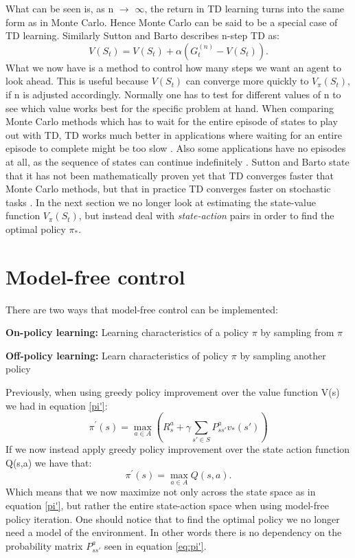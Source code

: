 What can be seen is, as n $\to$ $\infty$, the return in TD learning turns into the same form as in Monte Carlo. Hence Monte Carlo can be said to be a special case of TD learning.
Similarly Sutton and Barto describes n-step TD as:
\begin{equation}
	V(S_t) = V(S_t) + \alpha(G_t^{(n)} - V(S_t)).
	\label{eq:n_step_TD}
\end{equation} 
What we now have is a method to control how many steps we want an agent to look ahead. This is useful because $V(S_t)$ can converge more quickly to $V_\pi(S_t)$, if n is adjusted accordingly. Normally one has to test for different values of n to see which value works best for the specific problem at hand. When comparing Monte Carlo methods which has to wait for the entire episode of states to play out with TD, TD works much better in applications where waiting for an entire episode to complete might be too slow \cite{sutton_barto}. Also some applications have no episodes at all, as the sequence of states can continue indefinitely \cite{sutton_barto}. Sutton and Barto state that it has not been mathematically proven yet that TD converges faster that Monte Carlo methods, but that in practice TD converges faster on stochastic tasks \cite{sutton_barto}. In the next section we no longer look at estimating the state-value function $V_\pi(S_t)$, but instead deal with \textit{state-action} pairs in order to find the optimal policy $\pi_{*}$.

\section{Model-free control}
There are two ways that model-free control can be implemented:

\textbf{On-policy learning:}
Learning characteristics of a policy $\pi$ by sampling from $\pi$

\textbf{Off-policy learning:}
Learn characteristics of policy $\pi$ by sampling another policy

\noindent Previously, when using greedy policy improvement over the value function V(s) we had in equation \ref{pi'}:
\[\pi^{'}(s) = \max\limits_{a \in A}(R^{a}_s+\gamma\sum_{s'\in S}P^{a}_{ss'}v_*(s'))\]
If we now instead apply greedy policy improvement over the state action function Q(s,a) we have that:
\begin{equation}
	\pi^{'}(s) = \max\limits_{a \in A}Q(s,a).
	\label{eq:pi'}
\end{equation}
Which means that we now maximize not only across the state space as in equation \ref{pi'}, but rather the entire state-action space when using model-free policy iteration. One should notice that to find the optimal policy we no longer need a model of the environment. In other words there is no dependency on the probability matrix $P^{a}_{ss'}$ seen in equation \ref{eq:pi'}.

